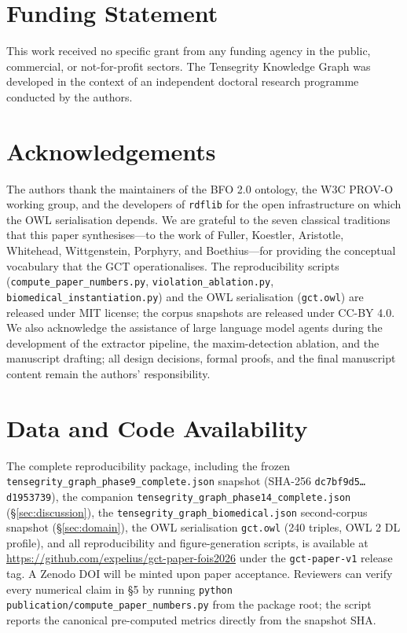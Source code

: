 \documentclass{iosart2x}
\begin{document}
\section*{Funding Statement}

This work received no specific grant from any funding agency in the public, commercial, or not-for-profit sectors. The Tensegrity Knowledge Graph was developed in the context of an independent doctoral research programme conducted by the authors.

\section*{Acknowledgements}

The authors thank the maintainers of the BFO 2.0 ontology, the W3C PROV-O working group, and the developers of \texttt{rdflib} for the open infrastructure on which the OWL serialisation depends. We are grateful to the seven classical traditions that this paper synthesises---to the work of Fuller, Koestler, Aristotle, Whitehead, Wittgenstein, Porphyry, and Boethius---for providing the conceptual vocabulary that the GCT operationalises. The reproducibility scripts (\texttt{compute\_paper\_numbers.py}, \texttt{violation\_ablation.py}, \texttt{biomedical\_instantiation.py}) and the OWL serialisation (\texttt{gct.owl}) are released under MIT license; the corpus snapshots are released under CC-BY 4.0. We also acknowledge the assistance of large language model agents during the development of the extractor pipeline, the maxim-detection ablation, and the manuscript drafting; all design decisions, formal proofs, and the final manuscript content remain the authors' responsibility.

\section*{Data and Code Availability}

The complete reproducibility package, including the frozen \texttt{tensegrity\_graph\_phase9\_complete.json} snapshot (SHA-256 \texttt{dc7bf9d5\ldots d1953739}), the companion \texttt{tensegrity\_graph\_phase14\_complete.json} (\S\ref{sec:discussion}), the \texttt{tensegrity\_graph\_biomedical.json} second-corpus snapshot (\S\ref{sec:domain}), the OWL serialisation \texttt{gct.owl} (240 triples, OWL 2 DL profile), and all reproducibility and figure-generation scripts, is available at \url{https://github.com/expelius/gct-paper-fois2026} under the \texttt{gct-paper-v1} release tag. A Zenodo DOI will be minted upon paper acceptance. Reviewers can verify every numerical claim in §5 by running \texttt{python publication/compute\_paper\_numbers.py} from the package root; the script reports the canonical pre-computed metrics directly from the snapshot SHA.
\end{document}
